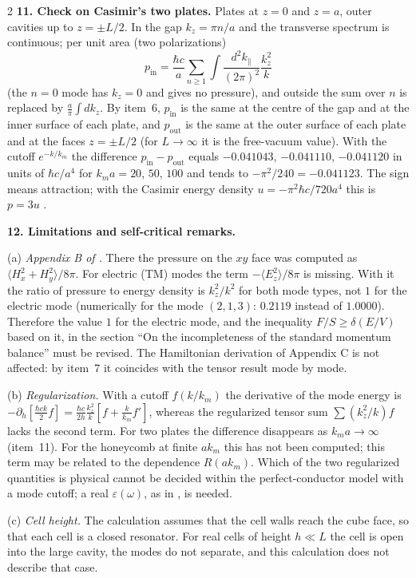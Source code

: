 \documentclass[twoside, 10pt]{article}
\begin{document}
\begin{multicols}{2}
\textbf{11. Check on Casimir's two plates.} Plates at $z=0$ and $z=a$, outer cavities
up to $z=\pm L/2$. In the gap $k_z=\pi n/a$ and the transverse spectrum is
continuous; per unit area (two polarizations)
\[
p_{\text{in}}=\frac{\hbar c}{a}\sum_{n\ge1}\int\frac{d^2k_\parallel}{(2\pi)^2}\frac{k_z^2}{k}
\]
(the $n=0$ mode has $k_z=0$ and gives no pressure), and outside the sum over $n$ is
replaced by $\frac a\pi\int dk_z$. By item~6, $p_{\text{in}}$ is the same at the centre
of the gap and at the inner surface of each plate, and $p_{\text{out}}$ is the same at
the outer surface of each plate and at the faces $z=\pm L/2$ (for $L\to\infty$ it is
the free-vacuum value). With the cutoff $e^{-k/k_m}$ the difference
$p_{\text{in}}-p_{\text{out}}$ equals $-0.041043$, $-0.041110$, $-0.041120$ in units of
$\hbar c/a^4$ for $k_ma=20$, $50$, $100$ and tends to $-\pi^2/240=-0.041123$. The sign
means attraction; with the Casimir energy density $u=-\pi^2\hbar c/720a^4$ this is
$p=3u$ \cite{BrownMaclay1969}.

\textbf{12. Limitations and self-critical remarks.}

(a) \textit{Appendix B of \cite{Drozdov2024}.} There the pressure on the $xy$ face was
computed as $\langle H_x^2+H_y^2\rangle/8\pi$. For electric (TM) modes the term
$-\langle E_z^2\rangle/8\pi$ is missing. With it the ratio of pressure to energy
density is $k_z^2/k^2$ for both mode types, not $1$ for the electric mode (numerically
for the mode $(2,1,3)$: $0.2119$ instead of $1.0000$). Therefore the value $1$ for the
electric mode, and the inequality $F/S\ge\delta(E/V)$ based on it, in the section
``On the incompleteness of the standard momentum balance'' must be revised. The
Hamiltonian derivation of Appendix C is not affected: by item~7 it coincides with
the tensor result mode by mode.

(b) \textit{Regularization.} With a cutoff $f(k/k_m)$ the derivative of the mode
energy is
$-\partial_h\!\left[\frac{\hbar ck}{2}f\right]=\frac{\hbar c}{2h}\frac{k_z^2}{k}\left[f+\frac{k}{k_m}f'\right]$,
whereas the regularized tensor sum $\sum(k_z^2/k)f$ lacks the second term. For two
plates the difference disappears as $k_ma\to\infty$ (item~11). For the honeycomb at
finite $ak_m$ this has not been computed; this term may be related to the
dependence $R(ak_m)$. Which of the two regularized quantities is physical cannot be
decided within the perfect-conductor model with a mode cutoff; a real
$\varepsilon(\omega)$, as in \cite{DLP1961}, is needed.

(c) \textit{Cell height.} The calculation assumes that the cell walls reach the cube
face, so that each cell is a closed resonator. For real cells of height $h\ll L$ the
cell is open into the large cavity, the modes do not separate, and this calculation
does not describe that case.


\end{multicols}
\end{document}
